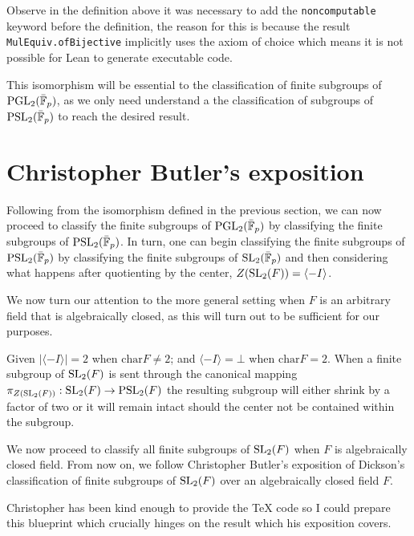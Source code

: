 \begin{remark}[Noncomputable]
    Observe in the definition above it was necessary to add the \texttt{noncomputable} keyword before the definition, the reason for this is
    because the result \texttt{MulEquiv.ofBijective} implicitly uses the axiom of choice which means it is not possible for Lean to generate
    executable code.
\end{remark}




This isomorphism will be essential to the classification of finite subgroups of $\operatorname{PGL}_2(\bar{\mathbb{F}}_p)$, as we only need understand a the classification of subgroups of $\operatorname{PSL}_2(\bar{\mathbb{F}}_p)$ to reach the desired result.


\section{Christopher Butler's exposition}

Following from the isomorphism defined in the previous section, we can now proceed to classify the finite subgroups of $\operatorname{PGL}_2(\bar{\mathbb{F}}_p)$ by classifying the finite subgroups of $\operatorname{PSL}_2(\bar{\mathbb{F}}_p)$. 
In turn, one can begin classifying the finite subgroups of $\operatorname{PSL}_2(\bar{\mathbb{F}}_p)$ by classifying the finite subgroups of $\operatorname{SL}_2(\bar{\mathbb{F}}_p)$ and then considering what happens after
quotienting by the center, $Z(\operatorname{SL}_2(F)) = \langle -I\rangle$.

We now turn our attention to the more general setting when $F$ is an arbitrary field that is algebraically closed, as this will turn out to be sufficient for our purposes.

Given $|\langle -I \rangle| = 2$ when $\textrm{char} F \ne 2$; and $\langle -I\rangle = \bot$ when $\textrm{char} F = 2$.
When a finite subgroup of $\operatorname{SL}_2(F)$ is sent through the canonical mapping $\pi_{Z(\operatorname{SL}_2(F))} : \operatorname{SL}_2(F) \rightarrow \operatorname{PSL}_2(F)$ 
the resulting subgroup will either shrink by a factor of two or it will remain intact should the center not be contained within the subgroup. 

We now proceed to classify all finite subgroups of $\operatorname{SL}_2(F)$ when $F$ is algebraically closed field. 
From now on, we follow Christopher Butler's exposition of Dickson's classification of finite subgroups of $\operatorname{SL}_2(F)$ over an algebraically closed field $F$. 

Christopher has been kind enough to provide the TeX code so I could prepare this blueprint which crucially hinges on the result which his exposition covers.